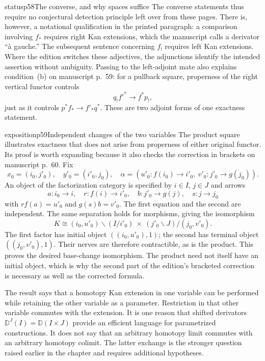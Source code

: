 \begin{dcomment}{status}{p58}{The converse, and why spaces suffice}
The converse statements thus require no conjectural detection principle left over from these pages. There is, however, a notational qualification in the printed paragraph: a comparison involving $f_*$ requires right Kan extensions, which the manuscript calls a derivator ``\`a gauche.'' The subsequent sentence concerning $f_!$ requires left Kan extensions. Where the edition switches these adjectives, the adjunctions identify the intended assertion without ambiguity. Passing to the left-adjoint mate also explains condition~(b) on manuscript p.~59: for a pullback square, properness of the right vertical functor controls
\[
 q_!f'^*\longrightarrow f^*p_!,
\]
just as it controls $p^*f_*\to f'_*q^*$. These are two adjoint forms of one exactness statement.
\end{dcomment}

\begin{dcomment}{exposition}{p59}{Independent changes of the two variables}
The product square illustrates exactness that does not arise from properness of either original functor. Its proof is worth expanding because it also checks the correction in brackets on manuscript p.~60. Fix
\[
 x_0=(i_0,j'_0),\quad y'_0=(i'_0,j_0),\quad
 \alpha=(u'_0:f(i_0)\to i'_0,\ v'_0:j'_0\to g(j_0)).
\]
An object of the factorization category is specified by $i\in I$, $j\in J$ and arrows
\[
 a:i_0\to i,\quad r:f(i)\to i'_0,\quad
 b:j'_0\to g(j),\quad s:j\to j_0
\]
with $r f(a)=u'_0$ and $g(s)b=v'_0$. The first equation and the second are independent. The same separation holds for morphisms, giving the isomorphism
\[
 K\cong
 (i_0,u'_0)\backslash(I/i'_0)
 \ \times\ 
 (j'_0\backslash J)/(j_0,v'_0).
\]
The first factor has initial object $((i_0,u'_0),1)$; the second has terminal object $((j_0,v'_0),1)$. Their nerves are therefore contractible, as is the product. This proves the desired base-change isomorphism. The product need not itself have an initial object, which is why the second part of the edition's bracketed correction is necessary as well as the corrected formula.

The result says that a homotopy Kan extension in one variable can be performed while retaining the other variable as a parameter. Restriction in that other variable commutes with the extension. It is one reason that shifted derivators $\mathbb D^J(I)=\mathbb D(I\times J)$ provide an efficient language for parametrized constructions. It does not say that an arbitrary homotopy limit commutes with an arbitrary homotopy colimit. The latter exchange is the stronger question raised earlier in the chapter and requires additional hypotheses.
\end{dcomment}


